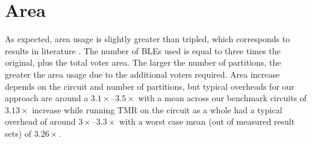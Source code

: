 \documentclass[12pt,final,oneside,a4paper]{dwThesis} %
\begin{document}
   \section{Area}
   As expected, area usage is slightly greater than tripled,
   which corresponds to results in literature \cite{HardeningTechniques}. The
   number of \glspl{BLE} used is equal to three times the original, plus the
   total voter area. The larger the number of partitions, the greater the area
   usage due to the additional voters required.
   Area increase depends on the circuit and number of partitions, but typical overheads for our approach are around a $3.1\times$--$3.5\times$ with a mean across our benchmark circuits of $3.13\times$ increase while
   running \gls{TMR} on the circuit as a whole had a typical overhead of around $3\times$--$3.3\times$ with a worst case mean (out of measured result sets) of $3.26\times$.
\end{document}
